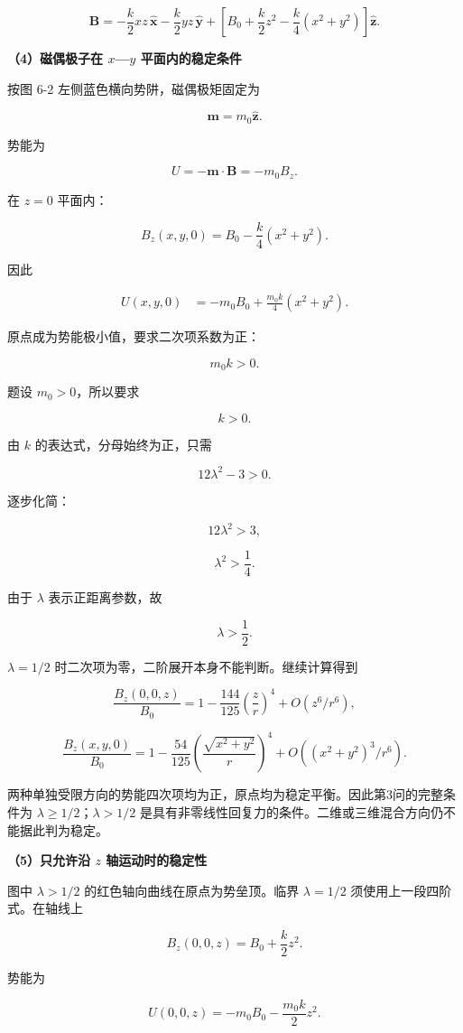 \documentclass[12pt,a4paper,UTF8]{ctexart}
\begin{document}
\[
\boxed{
\bm B=
-\frac k2xz\,\hat{\bm x}
-\frac k2yz\,\hat{\bm y}
+\left[
B_0+\frac k2z^2-\frac k4(x^2+y^2)
\right]\hat{\bm z}
}.
\]

\textbf{（4）磁偶极子在 \(x\)---\(y\) 平面内的稳定条件}

按图 6-2 左侧蓝色横向势阱，磁偶极矩固定为

\[\bm m=m_0\hat{\bm z}.\]

势能为

\[U=-\bm m\cdot\bm B=-m_0B_z.\]

在 \(z=0\) 平面内：

\[
B_z(x,y,0)=B_0-\frac k4(x^2+y^2).
\]

因此

\[
\begin{aligned}
U(x,y,0)
&=-m_0B_0+\frac{m_0k}{4}(x^2+y^2).
\end{aligned}
\]

原点成为势能极小值，要求二次项系数为正：

\[m_0k>0.\]

题设 \(m_0>0\)，所以要求

\[k>0.\]

由 \(k\) 的表达式，分母始终为正，只需

\[12\lambda^2-3>0.\]

逐步化简：

\[12\lambda^2>3,\]

\[\lambda^2>\frac14.\]

由于 \(\lambda\) 表示正距离参数，故

\[
\boxed{\lambda>\frac12}.
\]

\(\lambda=1/2\) 时二次项为零，二阶展开本身不能判断。继续计算得到

\[\frac{B_z(0,0,z)}{B_0}=1-\frac{144}{125}\left(\frac zr\right)^4+O(z^6/r^6),\]

\[\frac{B_z(x,y,0)}{B_0}=1-\frac{54}{125}\left(\frac{\sqrt{x^2+y^2}}r\right)^4+O((x^2+y^2)^3/r^6).\]

两种单独受限方向的势能四次项均为正，原点均为稳定平衡。因此第3问的完整条件为
\(\boxed{\lambda\ge1/2}\)；\(\lambda>1/2\)
是具有非零线性回复力的条件。二维或三维混合方向仍不能据此判为稳定。

\textbf{（5）只允许沿 \(z\) 轴运动时的稳定性}

图中 \(\lambda>1/2\) 的红色轴向曲线在原点为势垒顶。临界 \(\lambda=1/2\)
须使用上一段四阶式。在轴线上

\[
B_z(0,0,z)=B_0+\frac k2z^2.
\]

势能为

\[
U(0,0,z)=-m_0B_0-\frac{m_0k}{2}z^2.
\]
\end{document}
